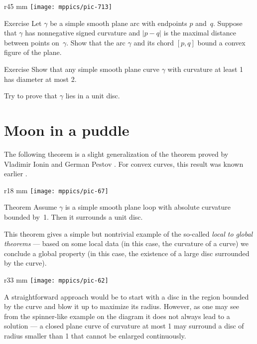 \begin{wrapfigure}{r}{45 mm}
\vskip-0mm
\centering
\texttt{[image: mppics/pic-713]}
\vskip0mm
\end{wrapfigure}

\begin{thm}{Exercise}\label{ex:convex-lens}
Let $\gamma$ be a simple smooth plane arc with endpoints $p$ and~$q$.
Suppose that $\gamma$ has nonnegative signed curvature and $|p-q|$ is the maximal distance between points on~$\gamma$.
Show that the arc $\gamma$ and its chord $[p,q]$ bound a convex figure of the plane.
\end{thm}

\begin{thm}{Exercise}\label{ex:diameter-of-simple-curve}
Show that any simple smooth plane curve $\gamma$ with curvature at least 1 has diameter at most 2.

Try to prove that $\gamma$ lies in a unit disc.
\end{thm}


\section{Moon in a puddle}

The following theorem is a slight generalization of the theorem proved by Vladimir Ionin and German Pestov \cite{ionin-pestov}.
For convex curves, this result was known earlier \cite[\S 24]{blaschke}.


\begin{wrapfigure}{r}{18 mm}
\vskip-8mm
\centering
\texttt{[image: mppics/pic-67]}
\vskip-2mm
\end{wrapfigure}

\begin{thm}{Theorem}\label{thm:moon-orginal}
Assume $\gamma$ is a simple smooth plane loop with absolute curvature bounded by~1.
Then it surrounds a unit disc.
\end{thm}

This theorem gives a simple but nontrivial example of the so-called \emph{local to global theorems} --- based on some local data (in this case, the curvature of a curve) we conclude a global property (in this case, the existence of a large disc surrounded by the curve).

{

\begin{wrapfigure}{r}{33 mm}
\vskip-4mm
\centering
\texttt{[image: mppics/pic-62]}
\vskip0mm
\end{wrapfigure}

A straightforward approach would be to start with a disc in the region bounded by the curve and blow it up to maximize its radius.
However, as one may see from the spinner-like example on the diagram it does not always lead to a solution --- a closed plane curve of curvature at most 1 may surround a disc of radius smaller than 1 that cannot be enlarged continuously.

}

